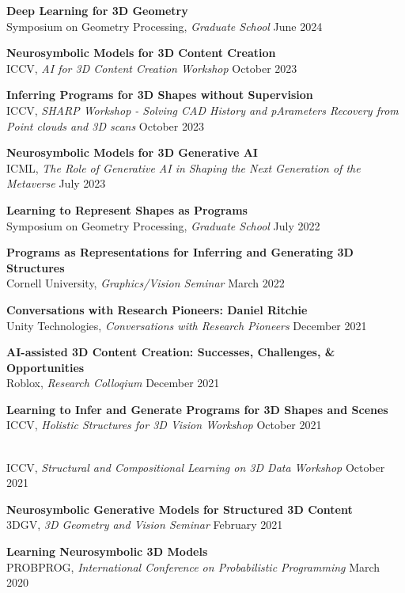 \documentclass[line,margin]{res}
\begin{document}
\begin{resume}
\newcommand{\talktitle}[1]{
	\textbf{#1}
}
\newcommand{\talk}[3]{
	#1, \emph{#2} \hfill #3
}

\talktitle{Deep Learning for 3D Geometry}\\
\talk
	{Symposium on Geometry Processing}
	{Graduate School}
	{June 2024}

\talktitle{Neurosymbolic Models for 3D Content Creation}\\
\talk
	{ICCV}
	{AI for 3D Content Creation Workshop}
	{October 2023}

\talktitle{Inferring Programs for 3D Shapes without Supervision}\\
\talk
	{ICCV}
	{SHARP Workshop - Solving CAD History and pArameters Recovery from Point clouds and 3D scans}
	{October 2023}

\talktitle{Neurosymbolic Models for 3D Generative AI}\\
\talk
	{ICML}
	{The Role of Generative AI in Shaping the Next Generation of the Metaverse}
	{July 2023}

\talktitle{Learning to Represent Shapes as Programs}\\
\talk
	{Symposium on Geometry Processing}
	{Graduate School}
	{July 2022}

\talktitle{Programs as Representations for Inferring and Generating 3D Structures}\\
\talk
	{Cornell University}
	{Graphics/Vision Seminar}
	{March 2022}

\talktitle{Conversations with Research Pioneers: Daniel Ritchie}\\
\talk
	{Unity Technologies}
	{Conversations with Research Pioneers}
	{December 2021}

\talktitle{AI-assisted 3D Content Creation: Successes, Challenges, \& Opportunities}\\
\talk
	{Roblox}
	{Research Colloqium}
	{December 2021}

\talktitle{Learning to Infer and Generate Programs for 3D Shapes and Scenes}\\
\talk
	{ICCV}
	{Holistic Structures for 3D Vision Workshop}
	{October 2021}
\\
\talk
	{ICCV}
	{Structural and Compositional Learning on 3D Data Workshop}
	{October 2021}

\talktitle{Neurosymbolic Generative Models for Structured 3D Content}\\
\talk
	{3DGV}
	{3D Geometry and Vision Seminar}
	{February 2021}

\talktitle{Learning Neurosymbolic 3D Models}\\
\talk
	{PROBPROG}
	{International Conference on Probabilistic Programming}
	{March 2020}


\end{resume}
\end{document}
